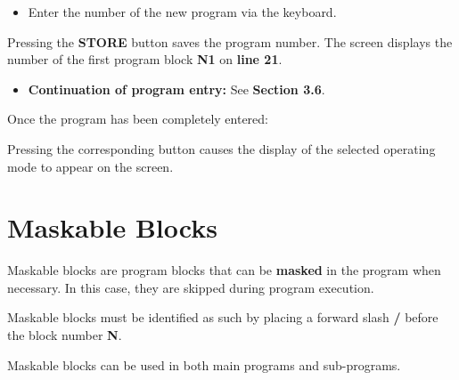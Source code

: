 \procedure

\begin{itemize}
    \vspace{.5cm}
    \item Enter the number of the new program via the keyboard.
\end{itemize}

\vspace{.5cm}

Pressing the \textbf{STORE} button saves the program number. The screen displays the number of the first program block \textbf{N1} on \textbf{line 21}.

\begin{itemize}
    \item \textbf{Continuation of program entry:} See \textbf{Section 3.6}.
\end{itemize}

\vspace{.5cm}

Once the program has been completely entered:

\begin{itemize}
\end{itemize}

\vspace{.5cm}

Pressing the corresponding button causes the display of the selected operating mode to appear on the screen.

\newpage

\section{Maskable Blocks}

Maskable blocks are program blocks that can be \textbf{masked} in the program when necessary. In this case, they are skipped during program execution.

Maskable blocks must be identified as such by placing a forward slash \textbf{/} before the block number \textbf{N}.

Maskable blocks can be used in both main programs and sub-programs.

